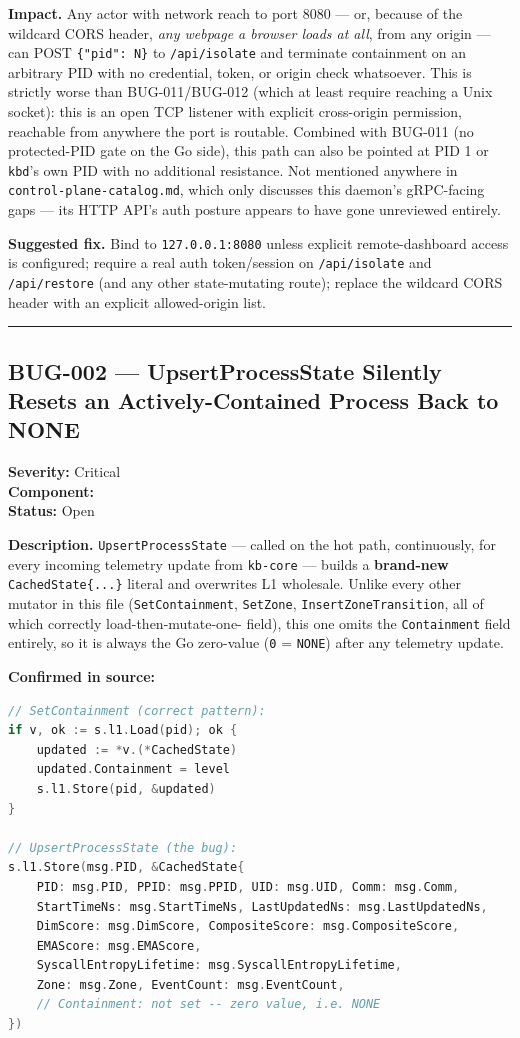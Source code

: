 \documentclass[11pt,a4paper]{article}
\newcommand{\bugmeta}[3]{%
  \noindent\textbf{Severity:} #1 \\
  \textbf{Component:} \ttfamily\seqsplit{#2}\normalfont \\
  \textbf{Status:} #3
  \par\vspace{0.5em}
}
\newcommand{\entrysep}{\vspace{0.4em}\noindent\rule{\linewidth}{0.3pt}\vspace{1.1em}}
\begin{document}
\textbf{Impact.} Any actor with network reach to port 8080 --- or, because
of the wildcard CORS header, \emph{any webpage a browser loads at all},
from any origin --- can POST \texttt{\{"pid": N\}} to \texttt{/api/isolate}
and terminate containment on an arbitrary PID with no credential, token, or
origin check whatsoever. This is strictly worse than BUG-011/BUG-012
(which at least require reaching a Unix socket): this is an open TCP
listener with explicit cross-origin permission, reachable from anywhere
the port is routable. Combined with BUG-011 (no protected-PID gate on the
Go side), this path can also be pointed at PID 1 or \texttt{kbd}'s own PID
with no additional resistance. Not mentioned anywhere in
\texttt{control-plane-catalog.md}, which only discusses this daemon's
gRPC-facing gaps --- its HTTP API's auth posture appears to have gone
unreviewed entirely.

\textbf{Suggested fix.} Bind to \texttt{127.0.0.1:8080} unless explicit
remote-dashboard access is configured; require a real auth token/session
on \texttt{/api/isolate} and \texttt{/api/restore} (and any other
state-mutating route); replace the wildcard CORS header with an explicit
allowed-origin list.

\entrysep

\subsection*{BUG-002 --- UpsertProcessState Silently Resets an Actively-Contained Process Back to NONE}
\bugmeta{Critical}{kb-control-plane/internal/store/process.go}{Open}

\textbf{Description.} \texttt{UpsertProcessState} --- called on the hot
path, continuously, for every incoming telemetry update from
\texttt{kb-core} --- builds a \textbf{brand-new} \texttt{CachedState\{...\}}
literal and overwrites L1 wholesale. Unlike every other mutator in this
file (\texttt{SetContainment}, \texttt{SetZone},
\texttt{InsertZoneTransition}, all of which correctly load-then-mutate-one-
field), this one omits the \texttt{Containment} field entirely, so it is
always the Go zero-value (\texttt{0} = \texttt{NONE}) after any telemetry
update.

\textbf{Confirmed in source:}
\begin{lstlisting}[language=Go]
// SetContainment (correct pattern):
if v, ok := s.l1.Load(pid); ok {
    updated := *v.(*CachedState)
    updated.Containment = level
    s.l1.Store(pid, &updated)
}

// UpsertProcessState (the bug):
s.l1.Store(msg.PID, &CachedState{
    PID: msg.PID, PPID: msg.PPID, UID: msg.UID, Comm: msg.Comm,
    StartTimeNs: msg.StartTimeNs, LastUpdatedNs: msg.LastUpdatedNs,
    DimScore: msg.DimScore, CompositeScore: msg.CompositeScore,
    EMAScore: msg.EMAScore,
    SyscallEntropyLifetime: msg.SyscallEntropyLifetime,
    Zone: msg.Zone, EventCount: msg.EventCount,
    // Containment: not set -- zero value, i.e. NONE
})
\end{lstlisting}
\end{document}
